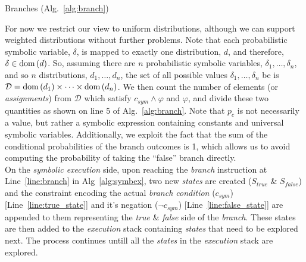 \begin{paragraph}{Branches (Alg.~\ref{alg:branch})}
	
	For now we restrict our view to uniform distributions, although we can support weighted distributions without further problems.
	Note that each probabilistic symbolic variable, $\delta$, is mapped to exactly one distribution, $d$, and therefore, $\delta \in \mathrm{dom}\left( d \right)$.
	So, assuming there are $n$ probabilistic symbolic variables, $\delta_1,\ldots,\delta_n$, and so $n$ distributions, $d_1,\ldots,d_n$, the set of all possible values $\delta_1,\ldots,\delta_n$ be is $\mathcal{D} = \mathrm{dom}\left( d_1 \right) \times \cdots \times \mathrm{dom}\left( d_n \right)$.
	We then count the number of elements (or \textit{assignments}) from $\mathcal{D}$ which satisfy $c_{sym} \wedge \varphi$ and $\varphi$, and divide these two quantities as shown on line 5 of Alg.~\ref{alg:branch}.
	Note that $p_c$ is not necessarily a value, but rather a symbolic expression containing constants and universal symbolic variables.
	Additionally, we exploit the fact that the sum of the conditional probabilities of the branch outcomes is 1, which allows us to avoid computing the probability of taking the ``false'' branch directly. \\
	On the \textit{symbolic execution} side, upon reaching the \textit{branch} instruction at Line~\ref{line:branch} in Alg~\ref{alg:symbex}, two new \textit{states} are created ($S_{true}$ \& $S_{false}$) and the constraint encoding the actual \textit{branch condition} ($c_{sym}$) [Line~\ref{line:true_state}] and it's negation ($\neg c_{sym}$)  [Line~\ref{line:false_state}] are appended to them representing the \textit{true} \& \textit{false} side of the \textit{branch}. 
	These states are then added to the \textit{execution} stack containing \textit{states} that need to be explored next. The process continues untill all the \textit{states} in the \textit{execution} stack are explored.
\end{paragraph}

